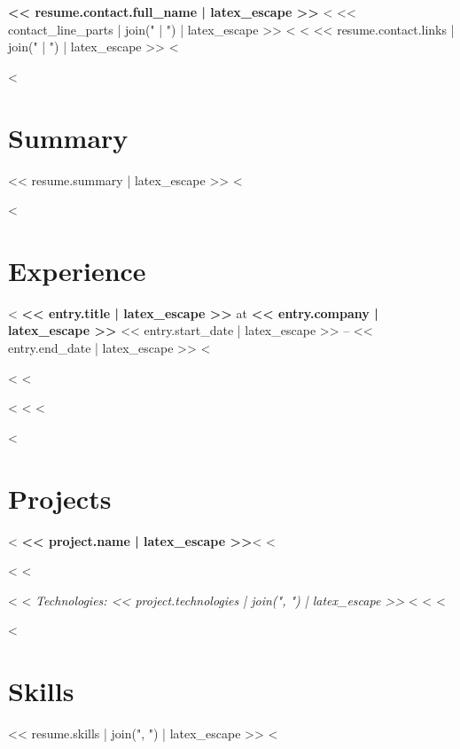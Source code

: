\documentclass[11pt]{article}
\begin{document}
\begin{center}
{\LARGE \textbf{<< resume.contact.full_name | latex_escape >>}}
<%
<< contact_line_parts | join(" | ") | latex_escape >>
<%
<%
<< resume.contact.links | join(" | ") | latex_escape >>
<%
\end{center}

<%
\section*{Summary}
<< resume.summary | latex_escape >>
<%

<%
\section*{Experience}
<%
\textbf{<< entry.title | latex_escape >>} at \textbf{<< entry.company | latex_escape >>} \hfill << entry.start_date | latex_escape >> -- << entry.end_date | latex_escape >>
<%
\begin{itemize}[leftmargin=*, noitemsep]
<%
<%
\end{itemize}
<%
<%
<%

<%
\section*{Projects}
<%
\textbf{<< project.name | latex_escape >>}<%
<%
\begin{itemize}[leftmargin=*, noitemsep]
<%
<%
\end{itemize}
<%
<%
\textit{Technologies: << project.technologies | join(", ") | latex_escape >>}
<%
<%
<%

<%
\section*{Skills}
<< resume.skills | join(", ") | latex_escape >>
<%
\end{document}
